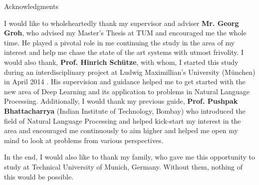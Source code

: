 \thispagestyle{empty}

\vspace*{2cm}

\begin{center}
{ Acknowledgments}
\end{center}

\vspace{1cm}

I would like to wholeheartedly thank my supervisor and adviser \textbf{Mr. Georg Groh}, who advised my Master's Thesis at TUM and encouraged me the whole time. He played a pivotal role in me continuing the study in the area of my interest and help me chase the state of the art systems with utmost frivolity. I would also thank, \textbf{Prof. Hinrich Schütze}, with whom, I started this study during an interdisciplinary project at Ludwig Maximillian's University (München) in April 2014 . His supervision and guidance helped me to get started with the new area of Deep Learning and its application to problems in Natural Language Processing. Additionally, I would thank my previous guide, \textbf{Prof. Pushpak Bhattacharrya} (Indian Institute of Technology, Bombay) who introduced the field of Natural Language Processing and helped kick-start my interest in the area and encouraged me continuously to aim higher and helped me open my mind to look at problems from various perspectives.  

In the end, I would also like to thank my family, who gave me this opportunity to study at Technical University of Munich, Germany. Without them, nothing of this would be possible. 
\cleardoublepage{}
